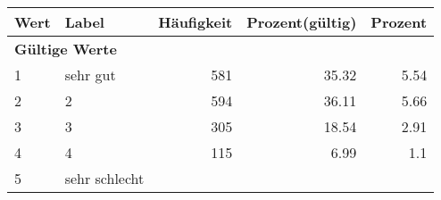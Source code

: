      \begin{longtable}{lXrrr}
     \toprule
     \textbf{Wert} & \textbf{Label} & \textbf{Häufigkeit} & \textbf{Prozent(gültig)} & \textbf{Prozent} \\
     \endhead
     \midrule
     \multicolumn{5}{l}{\textbf{Gültige Werte}}\\

     1 &
     \multicolumn{1}{X}{ sehr gut   } &


       \num{581} &
       \num[round-mode=places,round-precision=2]{35,32} &
         \num[round-mode=places,round-precision=2]{5,54} \\

     2 &
     \multicolumn{1}{X}{ 2   } &


       \num{594} &
       \num[round-mode=places,round-precision=2]{36,11} &
         \num[round-mode=places,round-precision=2]{5,66} \\

     3 &
     \multicolumn{1}{X}{ 3   } &


       \num{305} &
       \num[round-mode=places,round-precision=2]{18,54} &
         \num[round-mode=places,round-precision=2]{2,91} \\

     4 &
     \multicolumn{1}{X}{ 4   } &


       \num{115} &
       \num[round-mode=places,round-precision=2]{6,99} &
         \num[round-mode=places,round-precision=2]{1,1} \\

     5 &
     \multicolumn{1}{X}{ sehr schlecht   } &



\end{longtable}
